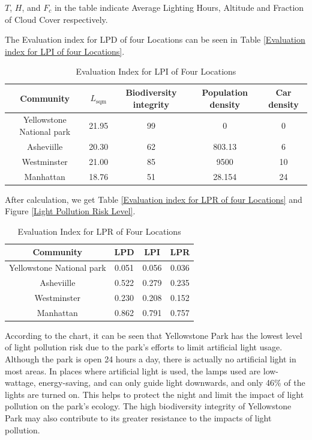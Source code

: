 \documentclass[12pt]{article}
\begin{document}
$T$, $H$, and $F_c$ in the table indicate Average Lighting Hours, Altitude and Fraction of Cloud Cover respectively.




The Evaluation index for LPD of four Locations can be seen in Table \ref{Evaluation index for LPI of four Locations}.
\begin{table}[h]
	\begin{center}
		\caption{Evaluation Index for LPI of Four Locations}\label{Evaluation index for LPI of four Locations}
\begin{tabular}{ccccc}
			\toprule
			 Community
			& $L_{\text{sqm}}$
                & Biodiversity integrity& Population density& Car density
                \\
			\midrule
   Yellowstone National park&21.95&99&0&0\\Asheviille&20.30
&62&803.13&6\\ Westminster&21.00&85&9500&10\\Manhattan&18.76
&51&28.154&24\\ 
			
			\bottomrule
		\end{tabular}\label{Ntt}
	\end{center}
\end{table}

After calculation, we get Table \ref{Evaluation index for LPR of four Locations} and Figure \ref{Light Pollution Risk Level}.
\begin{table}[h]
	\begin{center}
		\caption{Evaluation Index for LPR of Four Locations}\label{Evaluation index for LPR of four Locations}
           \begin{tabular}{cccc}
			\toprule
			Community
			&LPD
                & LPI&LPR
                \\
			\midrule
   Yellowstone National park&0.051&0.056&0.036\\Asheviille&0.522
&0.279&0.235\\ Westminster&0.230&0.208&0.152\\Manhattan&0.862
&0.791&0.757\\ 
			\bottomrule
		\end{tabular}\label{Ntt}
	\end{center}
\end{table}

According to the chart, it can be seen that Yellowstone Park has the lowest level of light pollution risk due to the park's efforts to limit artificial light usage. Although the park is open 24 hours a day, there is actually no artificial light in most areas. In places where artificial light is used, the lamps used are low-wattage, energy-saving, and can only guide light downwards, and only 46\% of the lights are turned on. This helps to protect the night and limit the impact of light pollution on the park's ecology. The high biodiversity integrity of Yellowstone Park may also contribute to its greater resistance to the impacts of light pollution.
\end{document}

